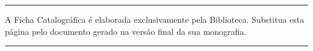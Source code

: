 

%
%     

 \begin{fichacatalografica}
   \vspace*{10cm}
   \hrule              %
   \begin{center}          %
   \begin{minipage}[c]{12.5cm}   %
     A Ficha Catalográfica é elaborada exclusivamente pela Biblioteca. Substitua esta página pelo documento gerado na versão final da sua monografia.
   \end{minipage}
   \end{center}
   \hrule
 \end{fichacatalografica}

 \pagebreak
